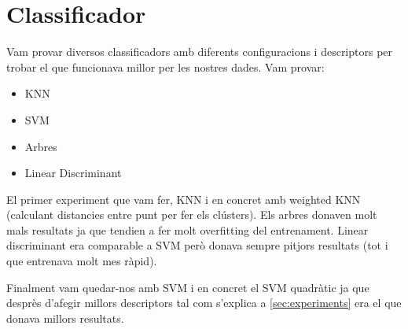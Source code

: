 
\section{Classificador}%
\label{sec:classificador}

Vam provar diversos classificadors amb diferents configuracions i descriptors per trobar el que funcionava millor per
les nostres dades. Vam provar:

\begin{itemize}
    \item KNN
    \item SVM
    \item Arbres
    \item Linear Discriminant
\end{itemize}

El primer experiment que vam fer, KNN i en concret amb weighted KNN
(calculant distancies entre punt per fer els clústers). Els arbres donaven molt
mals resultats ja que tendien a fer molt overfitting del entrenament. Linear
discriminant era comparable a SVM però donava sempre pitjors resultats (tot i
que entrenava molt mes ràpid).

Finalment vam quedar-nos amb SVM i en concret el SVM quadràtic ja que desprès
d'afegir millors descriptors tal com s'explica a \cref{sec:experiments} era el
que donava millors resultats.
